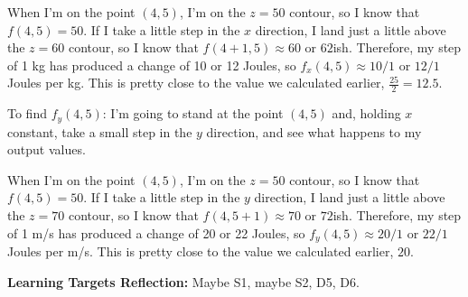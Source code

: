 \documentclass[10pt]{article}
\newenvironment{red}{\color{red}}{\ignorespacesafterend}
\begin{document}
\begin{enumerate}[leftmargin=0pt]
\begin{enumerate}
\begin{red}
            When I'm on the point $(4,5)$, I'm on the $z = 50$ contour, so I know that $f(4,5) = 50$. If I take a little step in the $x$ direction, I land just a little above the $z = 60$ contour, so I know that $f(4+1, 5) \approx 60$ or $62$ish. Therefore, my step of 1 kg has produced a change of 10 or 12 Joules, so $f_x(4,5) \approx 10/1$ or $12/1$ Joules per kg. This is pretty close to the value we calculated earlier, $\tfrac{25}{2} = 12.5$.
            
            To find $f_y(4,5)$: I'm going to stand at the point $(4,5)$ and, holding $x$ constant, take a small step in the $y$ direction, and see what happens to my output values.
            
            When I'm on the point $(4,5)$, I'm on the $z = 50$ contour, so I know that $f(4,5) = 50$. If I take a little step in the $y$ direction, I land just a little above the $z = 70$ contour, so I know that $f(4, 5+1) \approx 70$ or $72$ish. Therefore, my step of 1 m/s has produced a change of 20 or 22 Joules, so $f_y(4,5) \approx 20/1$ or $22/1$ Joules per m/s. This is pretty close to the value we calculated earlier, $20$.
            
            
        \end{red}
    \end{enumerate}

\end{enumerate}

\begin{red}
\textbf{Learning Targets Reflection:} Maybe S1, maybe S2, D5, D6.
\end{red}
\end{document}

